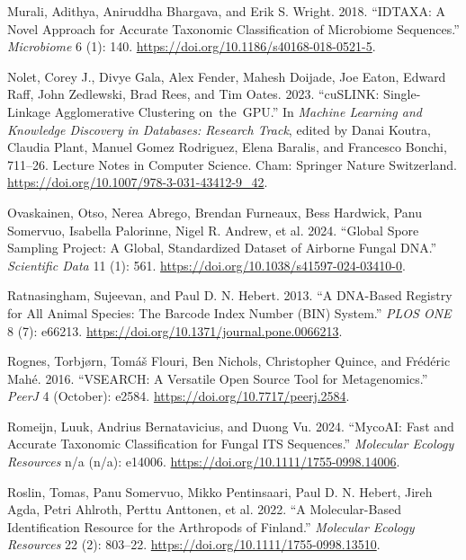 \documentclass[
]{article}
\newlength{\cslhangindent}
\newenvironment{CSLReferences}[2] %
 {\begin{list}{}{%
  \setlength{\itemindent}{0pt}
  \setlength{\leftmargin}{0pt}
  \setlength{\parsep}{0pt}
  \ifodd #1
   \setlength{\leftmargin}{\cslhangindent}
   \setlength{\itemindent}{-1\cslhangindent}
  \fi
  \setlength{\itemsep}{#2\baselineskip}}}
 {\end{list}}
\begin{document}
\begin{CSLReferences}{1}{0}
Murali, Adithya, Aniruddha Bhargava, and Erik S. Wright. 2018. {``{IDTAXA}: A Novel Approach for Accurate Taxonomic Classification of Microbiome Sequences.''} \emph{Microbiome} 6 (1): 140. \url{https://doi.org/10.1186/s40168-018-0521-5}.

Nolet, Corey J., Divye Gala, Alex Fender, Mahesh Doijade, Joe Eaton, Edward Raff, John Zedlewski, Brad Rees, and Tim Oates. 2023. {``{cuSLINK}: {Single-Linkage Agglomerative Clustering} on~the~{GPU}.''} In \emph{Machine {Learning} and {Knowledge Discovery} in {Databases}: {Research Track}}, edited by Danai Koutra, Claudia Plant, Manuel Gomez Rodriguez, Elena Baralis, and Francesco Bonchi, 711--26. Lecture {Notes} in {Computer Science}. Cham: Springer Nature Switzerland. \url{https://doi.org/10.1007/978-3-031-43412-9_42}.

Ovaskainen, Otso, Nerea Abrego, Brendan Furneaux, Bess Hardwick, Panu Somervuo, Isabella Palorinne, Nigel R. Andrew, et al. 2024. {``Global {Spore Sampling Project}: {A} Global, Standardized Dataset of Airborne Fungal {DNA}.''} \emph{Scientific Data} 11 (1): 561. \url{https://doi.org/10.1038/s41597-024-03410-0}.

Ratnasingham, Sujeevan, and Paul D. N. Hebert. 2013. {``A {DNA-Based Registry} for {All Animal Species}: {The Barcode Index Number} ({BIN}) {System}.''} \emph{PLOS ONE} 8 (7): e66213. \url{https://doi.org/10.1371/journal.pone.0066213}.

Rognes, Torbjørn, Tomáš Flouri, Ben Nichols, Christopher Quince, and Frédéric Mahé. 2016. {``{VSEARCH}: A Versatile Open Source Tool for Metagenomics.''} \emph{PeerJ} 4 (October): e2584. \url{https://doi.org/10.7717/peerj.2584}.

Romeijn, Luuk, Andrius Bernatavicius, and Duong Vu. 2024. {``{MycoAI}: {Fast} and Accurate Taxonomic Classification for Fungal {ITS} Sequences.''} \emph{Molecular Ecology Resources} n/a (n/a): e14006. \url{https://doi.org/10.1111/1755-0998.14006}.

Roslin, Tomas, Panu Somervuo, Mikko Pentinsaari, Paul D. N. Hebert, Jireh Agda, Petri Ahlroth, Perttu Anttonen, et al. 2022. {``A Molecular-Based Identification Resource for the Arthropods of {Finland}.''} \emph{Molecular Ecology Resources} 22 (2): 803--22. \url{https://doi.org/10.1111/1755-0998.13510}.


\end{CSLReferences}
\end{document}
